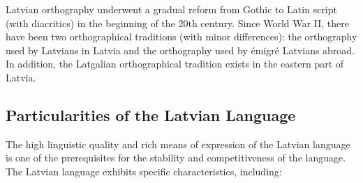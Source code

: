 \begin{multicols}{2}
Latvian orthography underwent a gradual reform from Gothic to Latin script (with diacritics) in the beginning of the 20th century.
Since World War II, there have been two orthographical traditions (with minor differences): the orthography used by Latvians in Latvia and the orthography used by émigré Latvians abroad.
In addition, the Latgalian orthographical tradition exists in the eastern part of Latvia.

\subsection{Particularities of the Latvian Language}
The high linguistic quality and rich means of expression of the Latvian language is one of the prerequisites for the stability and competitiveness of the language.
The Latvian language exhibits specific characteristics, including:


\end{multicols}
